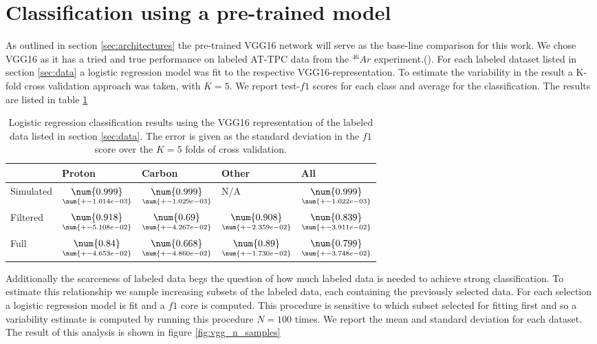 \section{Classification using a pre-trained model}

As outlined in section \ref{sec:architectures} the pre-trained VGG16 network will serve as the base-line comparison for this work. We chose VGG16 as it has a tried and true performance on labeled AT-TPC data from the $^{46}Ar$ experiment.(\cite{Kuchera2019}). For each labeled dataset listed in section \ref{sec:data} a logistic regression model was fit to the respective VGG16-representation. To estimate the variability in the result a K-fold cross validation approach was taken, with $K=5$. We report test-$f1$ scores for each class and average for the classification. The results are listed in table \ref{tab:vgg_results}

\begin{table}
\centering
\caption[VGG classification results]{Logistic regression classification results using the VGG16 representation of the labeled data listed in section \ref{sec:data}. The error is given as the standard deviation in the $f1$ score over the $K=5$ folds of cross validation.}\label{tab:vgg_results}
\begin{tabular}{lllll}
\toprule
{} & Proton & Carbon & Other & All \\
\midrule
Simulated &  $\underset{\num{+- 1.014e-03 }  }{\num{ 0.999 } }$ &  $\underset{\num{+- 1.029e-03 }  }{\num{ 0.999 } }$ &  N/A &  $\underset{\num{+- 1.022e-03 }  }{\num{ 0.999 } }$ \\
Filtered  &  $\underset{\num{+- 5.108e-02 }  }{\num{ 0.918 } }$ &  $\underset{\num{+- 4.267e-02 }  }{\num{ 0.69 } }$ &  $\underset{\num{+- 2.359e-02 }  }{\num{ 0.908 } }$ &  $\underset{\num{+- 3.911e-02 }  }{\num{ 0.839 } }$ \\
Full      &  $\underset{\num{+- 4.653e-02 }  }{\num{ 0.84 } }$ &  $\underset{\num{+- 4.860e-02 }  }{\num{ 0.668 } }$ &  $\underset{\num{+- 1.730e-02 }  }{\num{ 0.89 } }$ &  $\underset{\num{+- 3.748e-02 }  }{\num{ 0.799 } }$ \\
\bottomrule
\end{tabular}
\end{table}

 Additionally the scarceness of labeled data begs the question of how much labeled data is needed to achieve strong classification. To estimate this relationship we sample increasing subsets of the labeled data, each containing the previously selected data. For each selection a logistic regression model is fit and a $f1$ core is computed. This procedure is sensitive to which subset selected for fitting first and so a variability estimate is computed by running this procedure $N=100$ times. We report the mean and standard deviation for each dataset. The result of this analysis is shown in figure \ref{fig:vgg_n_samples}

